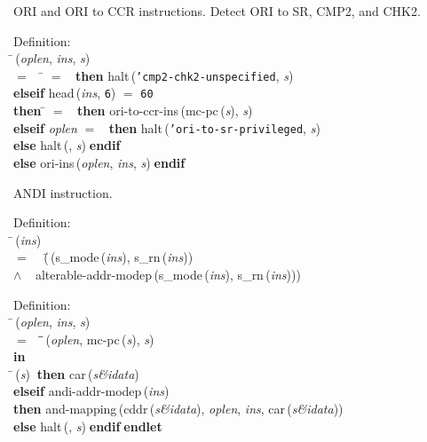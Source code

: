  ORI and ORI to CCR instructions.
 Detect ORI to SR, CMP2, and CHK2.
\begin{tabbing}{\sc Definition}: \\  
\=\,({\it{oplen\/}}, {\it{ins\/}}, {\it{s\/}}) \\ 
$=$$\;\;\;\;$\= $=$ {}$\;\;${\bf then }{\rm{halt}}\,({\tt{'}}{\tt{cmp2-chk2-unspecified}}, {\it{s\/}}) \\ 
{\bf elseif }{\rm{head}}\,({\it{ins\/}}, {\tt{6}}) $=$ {\tt{60}} \\ 
{\bf then }\= $=$ {}$\;\;${\bf then }{\rm{ori-to-ccr-ins}}\,({\rm{mc-pc}}\,({\it{s\/}}), {\it{s\/}}) \\ 
{\bf elseif }{\it{oplen\/}} $=$ {}$\;\;${\bf then }{\rm{halt}}\,({\tt{'}}{\tt{ori-to-sr-privileged}}, {\it{s\/}}) \\ 
{\bf else }{\rm{halt}}\,({}, {\it{s\/}})$\;${\bf  endif}\- \\ 
{\bf else }{\rm{ori-ins}}\,({\it{oplen\/}}, {\it{ins\/}}, {\it{s\/}})$\;${\bf  endif}\-\-
\end{tabbing}

 ANDI instruction.
\begin{tabbing}{\sc Definition}: \\  
\=\,({\it{ins\/}}) \\ 
$=$$\;\;\;\;$(\=\,({\rm{s\_mode}}\,({\it{ins\/}}), {\rm{s\_rn}}\,({\it{ins\/}})) \\ 
$\wedge$$\;\;\;\;${\rm{alterable-addr-modep}}\,({\rm{s\_mode}}\,({\it{ins\/}}), {\rm{s\_rn}}\,({\it{ins\/}})))\-\-
\end{tabbing}

\begin{tabbing}{\sc Definition}: \\  
\=\,({\it{oplen\/}}, {\it{ins\/}}, {\it{s\/}}) \\ 
$=$$\;\;\;\;$\=\=\,({\it{oplen\/}}, {\rm{mc-pc}}\,({\it{s\/}}), {\it{s\/}})\- \\ 
{\bf in} \\ 
\=\,({\it{s\/}})$\;\;${\bf then }{\rm{car}}\,({\it{s\&idata\/}}) \\ 
{\bf elseif }{\rm{andi-addr-modep}}\,({\it{ins\/}}) \\ 
{\bf then }{\rm{and-mapping}}\,({\rm{cddr}}\,({\it{s\&idata\/}}), {\it{oplen\/}}, {\it{ins\/}}, {\rm{car}}\,({\it{s\&idata\/}})) \\ 
{\bf else }{\rm{halt}}\,({}, {\it{s\/}})$\;${\bf  endif}\-$\;${\bf  endlet}\-\-
\end{tabbing}

